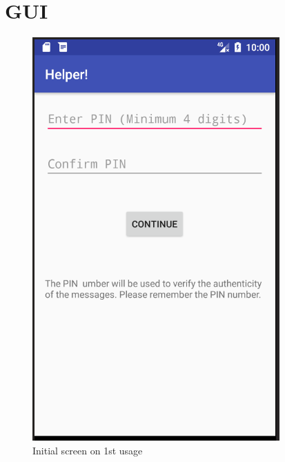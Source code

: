 		\section{GUI}
			\begin{figure}[h!]
				\centering	
			\includegraphics[scale=0.8]{1.png} %
			\caption{Initial screen on 1st usage}
			\label{fig:8} %
			
		\end{figure} 
	
